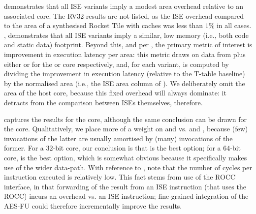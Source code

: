 
demonstrates that all ISE variants
imply a modest area overhead relative to an associated core.
The RV32  results are not listed, as the ISE overhead compared to
the area of a synthesised Rocket Tile with caches was less than $1\%$ in all
cases.
,
demonstrates that all ISE variants
imply a similar, low memory (i.e., both code and static data) footprint.
Beyond this, and per 
,
the primary metric of interest is
improvement in execution latency per area:
this metric draws on data from
plus either
or
for the  or  core respectively,
and, for each variant, is computed by dividing the improvement in execution 
latency (relative to the T-table baseline) by the normalised area (i.e., the 
ISE area column of ).  We deliberately omit the area of
the host core, because this fixed overhead will always dominate: it detracts 
from the comparison between ISEs themselves, therefore.

captures the results for the  core, although the same conclusion can 
be drawn for the  core.  Qualitatively, we place more of a weight on 
and 
vs.
and 
,
because
 (few) invocations of the latter 
are usually amortised by 
(many) invocations of the former.
For a $32$-bit core, our conclusion is that
is the best option;
for a $64$-bit core,
is the best option, which is somewhat obvious because it specifically makes
use of the wider data-path.
With reference to
, 
note that the number of cycles per instruction executed is relatively low.
This fact stems from use of the ROCC interface, in that forwarding of the 
result from an ISE instruction (that uses the ROCC) incurs an overhead vs. 
an ISE instruction; fine-grained integration of the AES-FU could therefore
incrementally improve the results.


